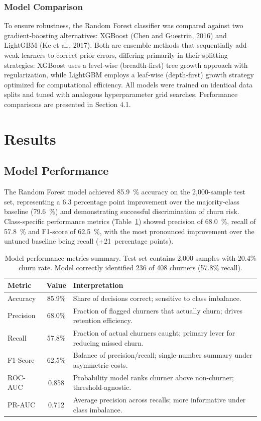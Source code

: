 \documentclass[12pt]{article}
\begin{document}
\subsubsection{Model Comparison}
To ensure robustness, the Random Forest classifier was compared against two gradient‑boosting alternatives: XGBoost (Chen and Guestrin, 2016) and LightGBM (Ke et al., 2017).  Both are ensemble methods that sequentially add weak learners to correct prior errors, differing primarily in their splitting strategies: XGBoost uses a level‑wise (breadth‑first) tree growth approach with regularization, while LightGBM employs a leaf‑wise (depth‑first) growth strategy optimized for computational efficiency.  All models were trained on identical data splits and tuned with analogous hyperparameter grid searches.  Performance comparisons are presented in Section 4.1.

\section{Results}
\subsection{Model Performance}
The Random Forest model achieved 85.9~\% accuracy on the 2,000-sample test set, representing a 6.3 percentage point improvement over the majority-class baseline (79.6~\%) and demonstrating successful discrimination of churn risk. Class-specific performance metrics (Table~\ref{tab:model_performance}) showed precision of 68.0~\%, recall of 57.8~\% and F1‑score of 62.5~\%, with the most pronounced improvement over the untuned baseline being recall (+21~percentage points).

\begin{table}[H]
\centering
\small
\caption{Model performance metrics summary. Test set contains 2,000 samples with 20.4\% churn rate. Model correctly identified 236 of 408 churners (57.8\% recall).}
\label{tab:model_performance}
\begin{tabular}{lcp{9.5cm}}
\toprule
\textbf{Metric} & \textbf{Value} & \textbf{Interpretation} \\
\midrule
Accuracy & 85.9\% & Share of decisions correct; sensitive to class imbalance. \\
\cmidrule(lr){1-3}
Precision & 68.0\% & Fraction of flagged churners that actually churn; drives retention efficiency. \\
\cmidrule(lr){1-3}
Recall & 57.8\% & Fraction of actual churners caught; primary lever for reducing missed churn. \\
\cmidrule(lr){1-3}
F1-Score & 62.5\% & Balance of precision/recall; single-number summary under asymmetric costs. \\
\cmidrule(lr){1-3}
ROC-AUC & 0.858 & Probability model ranks churner above non-churner; threshold-agnostic. \\
\cmidrule(lr){1-3}
PR-AUC & 0.712 & Average precision across recalls; more informative under class imbalance. \\
\bottomrule
\end{tabular}
\end{table}
\end{document}
